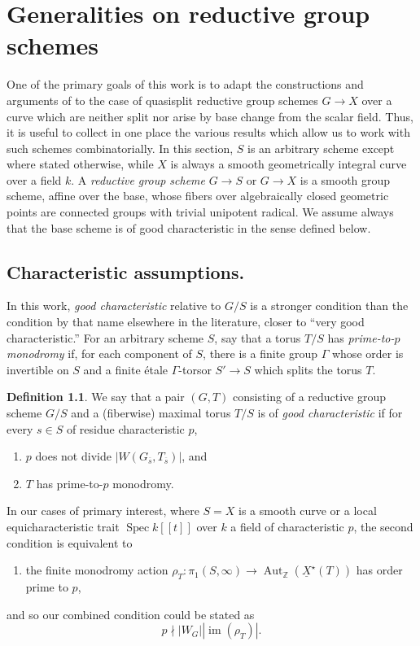 \documentclass[openany]{amsbook}
\theoremstyle{definition}
\newtheorem{definition}[theorem]{Definition}
\theoremstyle{remark}
\numberwithin{equation}{section}
\newcommand{\Z}{\mathbb{Z}}
\newcommand{\im}{\operatorname{im}}
\newcommand{\ol}[1]{\overline{#1}}
\newcommand{\ul}[1]{\underline{#1}}
\renewcommand{\-}{\operatorname{-}}
\newcommand{\Spec}{\operatorname{Spec}}
\newcommand{\Aut}{\operatorname{Aut}}
\begin{document}
\chapter{Generalities on reductive group schemes}\label{sect.rel.reduct.gps}

One of the primary goals of this work is to adapt the constructions and arguments of \cite{CLI, CLII} to the case of quasisplit reductive group schemes $G \to X$ over a curve which are neither split nor arise by base change from the scalar field. Thus, it is useful to collect in one place the various results which allow us to work with such schemes combinatorially. In this section, $S$ is an arbitrary scheme except where stated otherwise, while $X$ is always a smooth geometrically integral curve over a field $k$. A \textit{reductive group scheme} $G \to S$ or $G \to X$ is a smooth group scheme, affine over the base, whose fibers over algebraically closed geometric points are connected groups with trivial unipotent radical. We assume always that the base scheme is of good characteristic in the sense defined below. 

\section{Characteristic assumptions.}\label{subsect.char.assumptions}

In this work, \emph{good characteristic} relative to $G/S$ is a stronger condition than the condition by that name elsewhere in the literature, closer to ``very good characteristic.''  For an arbitrary scheme $S$, say that a torus $T/S$ has \emph{prime-to-$p$ monodromy} if, for each component of $S$, there is a finite group $\Gamma$ whose order is invertible on $S$ and a finite \'etale $\Gamma$-torsor $S' \to S$ which splits the torus $T$. 
\begin{definition}\label{def.good.characteristic}
We say that a pair $(G,T)$ consisting of a reductive group scheme $G/S$ and a (fiberwise) maximal torus $T/S$ is of \emph{good characteristic} if for every $s \in S$ of residue characteristic $p$,
\begin{enumerate}
    \item $p$ does not divide $|W(G_{\ol{s}}, T_{\ol{s}})|$, and
    \item $T$ has prime-to-$p$ monodromy. 
\end{enumerate}
\end{definition}

In our cases of primary interest, where $S = X$ is a smooth curve or a local equicharacteristic trait $\Spec k[\![t]\!]$ over $k$ a field of characteristic $p$, the second condition is equivalent to
\begin{enumerate}[start=2, label=({\arabic*}$'$)]
\item the finite monodromy action $\rho_T : \pi_1(S, \infty)\to \Aut_{\Z}(\ul{X}^\star(T))$ has order prime to $p$,
\end{enumerate}
and so our combined condition could be stated as 
$$
    p \nmid |W_G| |\im(\rho_T)|.
$$
\end{document}
